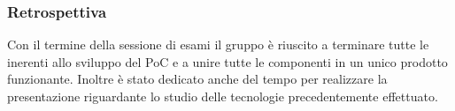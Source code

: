 \subsubsection{Retrospettiva}
\label{sec:sprint7_retrospettiva}
Con il termine della sessione di esami il gruppo è riuscito a terminare tutte le  inerenti allo sviluppo del PoC e a unire tutte le componenti in un unico prodotto funzionante.
Inoltre è stato dedicato anche del tempo per realizzare la presentazione riguardante lo studio delle tecnologie precedentemente effettuato.